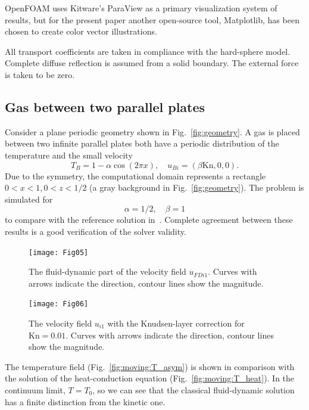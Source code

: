 \documentclass[smallextended, referee]{svjour3} %
\newcommand{\Kn}{\mathrm{Kn}}
\begin{document}
OpenFOAM\textregistered{} uses Kitware's ParaView\textregistered{} as a primary visualization system of results,
but for the present paper another open-source tool, Matplotlib, has been chosen to create color vector illustrations.

All transport coefficients are taken in compliance with the hard-sphere model.
Complete diffuse reflection is assumed from a solid boundary.
The external force is taken to be zero.

\subsection{Gas between two parallel plates}

Consider a plane periodic geometry shown in Fig.~\ref{fig:geometry}.
A gas is placed between two infinite parallel plates
both have a periodic distribution of the temperature and the small velocity
\begin{equation}
    T_B = 1-\alpha\cos(2\pi x), \quad u_{Bi} = (\beta\Kn,0,0).
\end{equation}
Due to the symmetry, the computational domain represents a rectangle \(0<x<1, 0<z<1/2\)
(a gray background in Fig.~\ref{fig:geometry}).
The problem is simulated for
\[ \alpha=1/2, \quad \beta = 1 \]
to compare with the reference solution in~\cite{SoneBobylev96}.
Complete agreement between these results is a good verification of the solver validity.

\begin{figure}
    \centering
    \texttt{[image: Fig05]}
    \caption{The fluid-dynamic part of the velocity field \(u_{FDi1}\).
        Curves with arrows indicate the direction, contour lines show the magnitude.}
    \label{fig:moving:fluid}
\end{figure}

\begin{figure}
    \centering
    \texttt{[image: Fig06]}
    \caption{The velocity field \(u_{i1}\) with the Knudsen-layer correction for \(\Kn=0.01\).
        Curves with arrows indicate the direction, contour lines show the magnitude.}
    \label{fig:moving:kn001}
\end{figure}

The temperature field (Fig.~\ref{fig:moving:T_asym}) is shown
in comparison with the solution of the heat-conduction equation (Fig.~\ref{fig:moving:T_heat}).
In the continuum limit, \(T=T_0\), so we can see that the classical fluid-dynamic solution
has a finite distinction from the kinetic one.
\end{document}
